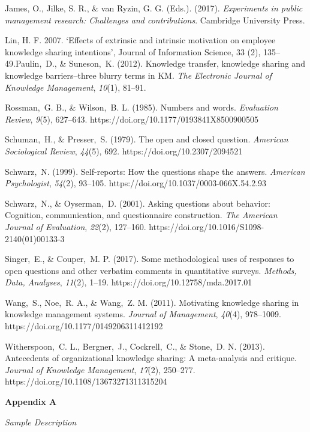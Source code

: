 \documentclass{article}
\begin{document}
James, O., Jilke, S. R., \& van Ryzin, G. G. (Eds.). (2017). \emph{Experiments in public management research: Challenges and contributions}. Cambridge University Press. 

Lin, H. F. 2007. ‘Effects of extrinsic and intrinsic motivation on employee knowledge sharing intentions', Journal of Information Science, 33 (2), 135--49.Paulin, D., \& Suneson, K. (2012). Knowledge transfer, knowledge sharing and knowledge barriers--three blurry terms in KM. \emph{The Electronic Journal of Knowledge Management}, \emph{10}(1), 81--91.

Rossman, G. B., \& Wilson, B. L. (1985). Numbers and words. \emph{Evaluation Review}, \emph{9}(5), 627--643. https://doi.org/10.1177/0193841X8500900505

Schuman, H., \& Presser, S. (1979). The open and closed question. \emph{American Sociological Review}, \emph{44}(5), 692. https://doi.org/10.2307/2094521

Schwarz, N. (1999). Self-reports: How the questions shape the answers. \emph{American Psychologist}, \emph{54}(2), 93--105. https://doi.org/10.1037/0003-066X.54.2.93

Schwarz, N., \& Oyserman, D. (2001). Asking questions about behavior: Cognition, communication, and questionnaire construction. \emph{The American Journal of Evaluation}, \emph{22}(2), 127--160. https://doi.org/10.1016/S1098-2140(01)00133-3

Singer, E., \& Couper, M. P. (2017). Some methodological uses of responses to open questions and other verbatim comments in quantitative surveys. \emph{Methods, Data, Analyses}, \emph{11}(2), 1--19. https://doi.org/10.12758/mda.2017.01

Wang, S., Noe, R. A., \& Wang, Z. M. (2011). Motivating knowledge sharing in knowledge management systems. \emph{Journal of Management}, \emph{40}(4), 978--1009. https://doi.org/10.1177/0149206311412192

Witherspoon, C. L., Bergner, J., Cockrell, C., \& Stone, D. N. (2013). Antecedents of organizational knowledge sharing: A meta-analysis and critique. \emph{Journal of Knowledge Management}, \emph{17}(2), 250--277. https://doi.org/10.1108/13673271311315204



\textbf{}

\textbf{}

\textbf{Appendix A}

\emph{Sample Description}
\end{document}
